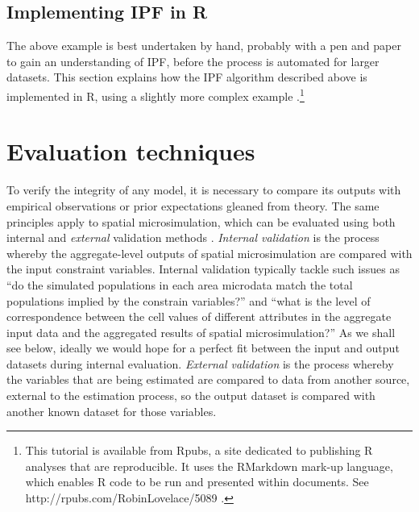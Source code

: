 \documentclass[a4paper,10pt]{article}
\begin{document}
\subsection{Implementing IPF in R} \label{simplementing}
The above example is best undertaken by hand, probably with a pen and paper
to gain an understanding of IPF, before the process is automated for 
larger datasets. This section explains how the IPF
algorithm described above is implemented in R, using a slightly more
complex example
\citep{Lovelace2013-trs}.\footnote{This 
tutorial is available from Rpubs, a site dedicated
to publishing R analyses that are reproducible. It uses the RMarkdown
mark-up language, which enables R code to be run and presented within
documents. See http://rpubs.com/RobinLovelace/5089 \label{fnrpub} .
}

\section{Evaluation techniques}

To verify the integrity of any model, it is necessary to compare its outputs
with empirical observations or prior expectations gleaned from theory.
The same principles apply to spatial microsimulation, which can be evaluated using
both internal and \emph{external} validation methods \citep{Edwards2009}.
\emph{Internal validation} is the process whereby
the aggregate-level outputs of spatial microsimulation are compared with
the input constraint variables. Internal validation typically tackle such issues
as ``do the simulated populations in each area
microdata match the total populations implied by the constrain variables?''
and ``what is the level of correspondence between the cell values of different
attributes in the aggregate input data and the aggregated results of spatial microsimulation?''
As we shall see below, ideally we would hope for a perfect fit between the input
and output datasets during internal evaluation.
\emph{External validation} is the process whereby the variables that are
being estimated are compared to data from another source,
external to the estimation process, so the output dataset is compared with
another known dataset for those variables.
\end{document}
